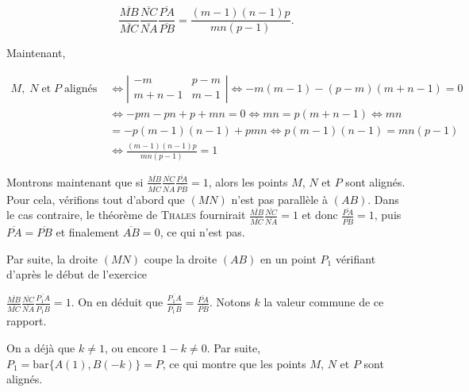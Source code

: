 {{\begin{itemize}
$$\frac{\overline{MB}}{\overline{MC}}\frac{\overline{NC}}{\overline{NA}}\frac{\overline{PA}}{\overline{PB}}=
\frac{(m-1)(n-1)p}{mn(p-1)}.$$

Maintenant,

\begin{align*}
M,\;N\;\mbox{et}\;P\;\mbox{alignés}\;&\Leftrightarrow
\left|
\begin{array}{cc}
-m&p-m\\
m+n-1&m-1
\end{array}
\right|
\Leftrightarrow-m(m-1)-(p-m)(m+n-1)=0\\
 &\Leftrightarrow-pm-pn+p+mn=0\Leftrightarrow mn=p(m+n-1)\Leftrightarrow mn\\
 &=-p(m-1)(n-1)+pmn\Leftrightarrow p(m-1)(n-1)=mn(p-1)\\
 &\Leftrightarrow\frac{(m-1)(n-1)p}{mn(p-1)}=1
\end{align*}

\end{itemize}

Montrons maintenant que si $\frac{\overline{MB}}{\overline{MC}}\frac{\overline{NC}}{\overline{NA}}\frac{\overline{PA}}{\overline{PB}}=1$, alors les points $M$, $N$ et $P$ sont alignés. Pour cela, vérifions tout d'abord que $(MN)$ n'est pas parallèle à $(AB)$. Dans le cas contraire, le théorème de \textsc{Thales} fournirait $\frac{\overline{MB}}{\overline{MC}}\frac{\overline{NC}}{\overline{NA}}=1$ et donc  $\frac{\overline{PA}}{\overline{PB}}=1$, puis $\overline{PA}=\overline{PB}$ et finalement $\overline{AB}=0$, ce qui n'est pas.

Par suite, la droite $(MN)$ coupe la droite $(AB)$ en un point $P_1$ vérifiant d'après le début de l'exercice

$\frac{\overline{MB}}{\overline{MC}}\frac{\overline{NC}}{\overline{NA}}\frac{\overline{P_1A}}{\overline{P_1B}}=1$. On en déduit que $\frac{\overline{P_1A}}{\overline{P_1B}}=\frac{\overline{PA}}{\overline{PB}}$. Notons $k$ la valeur commune de ce rapport.

On a déjà que $k\neq1$, ou encore $1-k\neq0$. Par suite, $P_1=\mbox{bar}\{A(1),B(-k)\}=P$, ce qui montre que les points $M$, $N$ et $P$ sont alignés.
}
}
